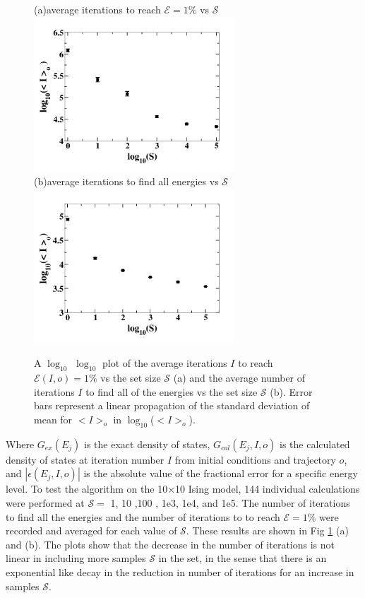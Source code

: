 \documentclass[aps,prl,reprint,superscriptaddress,showkeys]{revtex4-1}
\begin{document}
\begin{figure}[h!]
(a)\hspace{0.1cm}average iterations to reach $\mathcal{E}=1\%$ vs $\mathcal{S}$\\
\includegraphics[width=7.5cm]{Fig1a.png}\\
(b)\hspace{0.1cm}average iterations to find all energies vs $\mathcal{S}$\\
\includegraphics[width=7.5cm]{Fig1b.png}
\caption{\label{its_to}A $\log_{10}$ $\log_{10}$  plot of the average iterations $I$ to reach $\mathcal{E}(I,o)=1\%$ vs the set size $\mathcal{S}$ (a) and the average number of iterations $I$ to find all of the energies vs the set size $\mathcal{S}$ (b). Error bars represent a linear propagation of the standard deviation of mean for $<I>_o$ in $\log_{10}$($<I>_o$). }
\end{figure}
Where $G_{ex}(E_j)$ is the exact density of states, $G_{cal}(E_j,I,o)$ is the calculated density of states  at iteration number $I$ from initial conditions and trajectory $o$, and $|\epsilon(E_j,I,o)|$ is the absolute value of the fractional error for a specific energy level. To test the algorithm on the 10$\times$10 Ising model, 144 individual calculations were performed at  $\mathcal{S}=$ 1, 10 ,100 , 1e3,  1e4, and 1e5. The number of iterations to find all the energies and the number of iterations to to reach $\mathcal{E}=1\%$ were recorded and averaged for each value of $\mathcal{S}$. These results are shown in Fig \ref{its_to}  (a) and (b).  The plots show that the decrease in the number of iterations is not linear in including more samples $\mathcal{S}$ in the set, in the sense that there is an exponential like decay in the reduction in number of  iterations for an increase in samples $\mathcal{S}$.  
\end{document}
